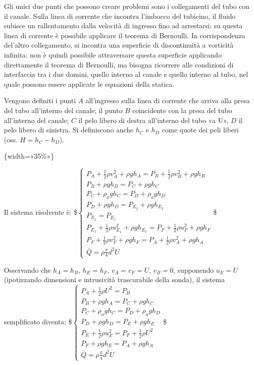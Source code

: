 \documentclass[letterpaper,10pt,italian]{jupyterBook}
\begin{document}
\sphinxAtStartPar
Gli unici due punti che possono creare problemi sono i collegamenti del
tubo con il canale. Sulla linea di corrente che incontra l’imbocco del
tubicino, il fluido subisce un rallentamento dalla velocità di ingresso
fino ad arrestarsi: su questa linea di corrente è possibile applicare il
teorema di Bernoulli. In corrispondenza del’altro collegamento, si
incontra una superficie di discontinuità a vorticità infinita: non è
quindi possibile attraversare questa superficie applicando direttamente
il teorema di Bernoulli, ma bisogna ricorrere alle condizioni di
interfaccia tra i due domini, quello interno al canale e quello interno
al tubo, nel quale possono essere applicate le equazioni della statica.

\sphinxAtStartPar
Vengono definiti i punti \(A\) all’ingresso sulla linea di corrente che
arriva alla presa del tubo all’interno del canale; il punto \(B\)
coincidente con la presa del tubo all’interno del canale; \(C\) il pelo
libero di destra all’interno del tubo «a U», \(D\) il pelo libero di
sinistra. Si definiscono anche \(h_C\) e \(h_D\) come quote dei peli liberi
(oss. \(H = h_C - h_D\)).

\sphinxAtStartPar
{}\{width=»35\%»\}

\sphinxAtStartPar
Il sistema risolvente è: \$\(\begin{cases}
  P_A + \frac{1}{2} \rho v_A^2 + \rho g h_A =
   P_B + \frac{1}{2} \rho v_B^2 + \rho g h_B\\
  P_B + \rho g h_B = P_C + \rho g h_C   \\
  P_C + \rho_a g h_C = P_D + \rho_a g h_D\\
  P_D + \rho g h_D = P_{E_2} + \rho g h_{E_2} \\
  P_{E_2} = P_{E_1} \\
  P_{E_1} + \frac{1}{2} \rho u_{E_1}^2 + \rho g h_{E_1} = P_F + \frac{1}{2} \rho u_F^2 + \rho g h_F\\
 P_F + \frac{1}{2} \rho v_F^2 + \rho g h_F = P_A + \frac{1}{2} \rho v_A^2 + \rho g h_A \\
  \bar{Q} = \rho \frac{\pi}{4}d^2 U
\end{cases}\)\$

\sphinxAtStartPar
Osservando che \(h_A = h_B\), \(h_E = h_F\), \(v_A = v_F = U\), \(v_B = 0\),
supponendo \(u_E = U\) (ipotizzando dimensioni e intrusività trascurabile
della sonda), il sistema semplificato diventa: \$\(\begin{cases}
  P_A + \frac{1}{2} \rho U^2  = P_B \\
  P_B + \rho g h_A = P_C + \rho g h_C   \\
  P_C + \rho_a g h_C = P_D + \rho_a g h_D\\
  P_D + \rho g h_D = P_E + \rho g h_E \\
  P_E + \frac{1}{2} \rho u_E^2 = P_F + \frac{1}{2} \rho U^2 \\
 P_F + \rho g h_E = P_A + \rho g h_A \\
  \bar{Q} = \rho \frac{\pi}{4}d^2 U
\end{cases}\)\$
\end{document}

